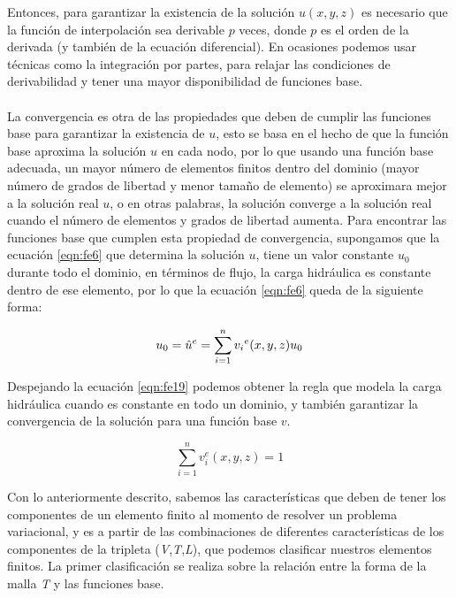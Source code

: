 Entonces, para garantizar la existencia de la solución $u(x,y,z)$ es necesario que la función de interpolación sea derivable $p$ veces, donde $p$ es el orden de la derivada (y también de la ecuación diferencial). En ocasiones podemos usar técnicas como la integración por partes, para relajar las condiciones de derivabilidad y tener una mayor disponibilidad de funciones base.
\\
\\
La convergencia es otra de las propiedades que deben de cumplir las funciones base para garantizar la existencia de $u$, esto se basa en el hecho de que la función base aproxima la solución $u$ en cada nodo, por lo que usando una función base adecuada, un mayor número de elementos finitos dentro del dominio (mayor número de grados de libertad y menor tamaño de elemento) se aproximara mejor a la solución real $u$, o en otras palabras, la solución converge a la solución real cuando el número de elementos y grados de libertad aumenta. Para encontrar las funciones base que cumplen esta propiedad de convergencia, supongamos que la ecuación \ref{eqn:fe6} que determina la solución $u$, tiene un valor constante $u_{0}$ durante todo el dominio, en términos de flujo, la carga hidráulica es constante dentro de ese elemento, por lo que la ecuación \ref{eqn:fe6} queda de la siguiente forma:

\begin{equation}
\label{eqn:fe19}
\\   u_{0}=\hat{u}^{e}=\displaystyle\sum_{i=1}^n {v_{i}}^{e}(x,y,z)u_{0}
\end{equation}

Despejando la ecuación \ref{eqn:fe19} podemos obtener la regla que modela la carga hidráulica cuando es constante en todo un dominio, y también garantizar la convergencia de la solución para una función base $v$.

\begin{equation}
\label{eqn:fe20}
    \displaystyle\sum_{i=1}^n  v_{i}^{e}(x,y,z) = 1        
\end{equation}

Con lo anteriormente descrito, sabemos las características que deben de tener los componentes de un elemento finito al momento de resolver un problema variacional, y es a partir de las combinaciones de diferentes características de los componentes de la tripleta (\textit{V},\textit{T},\textit{L}), que podemos clasificar nuestros elementos finitos. La primer clasificación se realiza sobre la relación entre la forma de la malla \textit{T} y las funciones base.
\\

